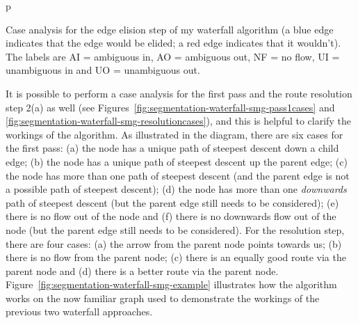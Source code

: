 \begin{stusubfig}{p}
	\hspace{4mm}
\caption{Case analysis for the edge elision step of my waterfall algorithm (a blue edge indicates that the edge would be elided; a red edge indicates that it wouldn't). The labels are AI = ambiguous in, AO = ambiguous out, NF = no flow, UI = unambiguous in and UO = unambiguous out.}
\label{fig:segmentation-waterfall-smg-mergecases}
\end{stusubfig}

\noindent It is possible to perform a case analysis for the first pass and the route resolution step 2(a) as well (see Figures~\ref{fig:segmentation-waterfall-smg-pass1cases} and \ref{fig:segmentation-waterfall-smg-resolutioncases}), and this is helpful to clarify the workings of the algorithm. As illustrated in the diagram, there are six cases for the first pass: (a) the node has a unique path of steepest descent down a child edge; (b) the node has a unique path of steepest descent up the parent edge; (c) the node has more than one path of steepest descent (and the parent edge is not a possible path of steepest descent); (d) the node has more than one \emph{downwards} path of steepest descent (but the parent edge still needs to be considered); (e) there is no flow out of the node and (f) there is no downwards flow out of the node (but the parent edge still needs to be considered). For the resolution step, there are four cases: (a) the arrow from the parent node points towards us; (b) there is no flow from the parent node; (c) there is an equally good route via the parent node and (d) there is a better route via the parent node. Figure~\ref{fig:segmentation-waterfall-smg-example} illustrates how the algorithm works on the now familiar graph used to demonstrate the workings of the previous two waterfall approaches.

